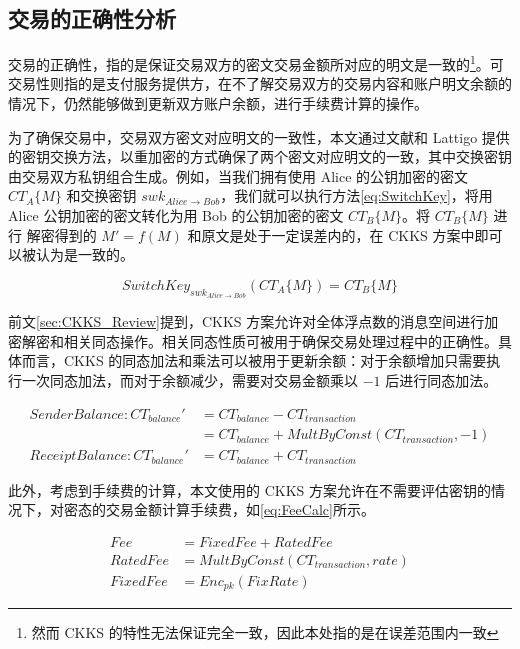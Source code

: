 \subsection{交易的正确性分析}

交易的正确性，指的是保证交易双方的密文交易金额所对应的明文是一致的\footnote{然而 CKKS 的特性无法保证完全一致，因此本处指的是在误差范围内一致}。可交易性则指的是支付服务提供方，在不了解交易双方的交易内容和账户明文余额的情况下，仍然能够做到更新双方账户余额，进行手续费计算的操作。

为了确保交易中，交易双方密文对应明文的一致性，本文通过文献\cite{brakerski2014leveled}和 Lattigo 提供的密钥交换方法，以重加密的方式确保了两个密文对应明文的一致，其中交换密钥由交易双方私钥组合生成。例如，当我们拥有使用 Alice 的公钥加密的密文 $CT_{A}\{M\}$ 和交换密钥 $swk_{Alice \rightarrow Bob}$，我们就可以执行方法\eqref{eq:SwitchKey}，将用 Alice 公钥加密的密文转化为用 Bob 的公钥加密的密文 $CT_{B}\{M\}$。将 $CT_{B}\{M\}$ 进行 解密得到的 $M' = f(M)$ 和原文是处于一定误差内的，在 CKKS 方案中即可以被认为是一致的。

\begin{equation} \label{eq:SwitchKey}
    SwitchKey_{swk_{Alice \rightarrow Bob}}(CT_{A}\{M\}) = CT_{B}\{M\}
\end{equation}

前文\ref{sec:CKKS_Review}提到，CKKS 方案允许对全体浮点数的消息空间进行加密解密和相关同态操作。相关同态性质可被用于确保交易处理过程中的正确性。具体而言，CKKS 的同态加法和乘法可以被用于更新余额：对于余额增加只需要执行一次同态加法，而对于余额减少，需要对交易金额乘以 $-1$ 后进行同态加法。

\begin{equation}
\begin{aligned}
    Sender Balance:  CT_{balance}' & = CT_{balance} - CT_{transaction}\\
    &= CT_{balance} + MultByConst(CT_{transaction}, -1)\\
    Receipt Balance: CT_{balance}' & = CT_{balance} + CT_{transaction}
\end{aligned}
\end{equation}

此外，考虑到手续费的计算，本文使用的 CKKS 方案允许在不需要评估密钥的情况下，对密态的交易金额计算手续费，如\eqref{eq:FeeCalc}所示。

\begin{equation} \label{eq:FeeCalc}
\begin{aligned}
    Fee & = FixedFee + RatedFee \\
    RatedFee & = MultByConst(CT_{transaction}, rate) \\
    FixedFee & = Enc_{pk}(FixRate)
\end{aligned}
\end{equation}
